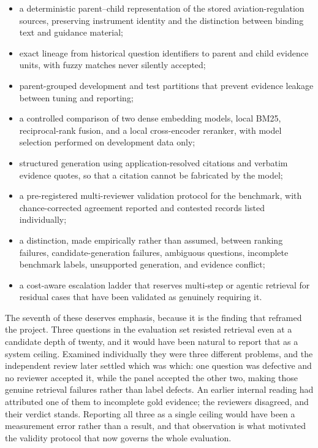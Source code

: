 \begin{itemize}
  \item a deterministic parent--child representation of the stored aviation-regulation sources, preserving instrument identity and the distinction between binding text and guidance material;
  \item exact lineage from historical question identifiers to parent and child evidence units, with fuzzy matches never silently accepted;
  \item parent-grouped development and test partitions that prevent evidence leakage between tuning and reporting;
  \item a controlled comparison of two dense embedding models, local BM25, reciprocal-rank fusion, and a local cross-encoder reranker, with model selection performed on development data only;
  \item structured generation using application-resolved citations and verbatim evidence quotes, so that a citation cannot be fabricated by the model;
  \item a pre-registered multi-reviewer validation protocol for the benchmark, with chance-corrected agreement reported and contested records listed individually;
  \item a distinction, made empirically rather than assumed, between ranking failures, candidate-generation failures, ambiguous questions, incomplete benchmark labels, unsupported generation, and evidence conflict;
  \item a cost-aware escalation ladder that reserves multi-step or agentic retrieval for residual cases that have been validated as genuinely requiring it.
\end{itemize}

The seventh of these deserves emphasis, because it is the finding that reframed the project. Three questions in the evaluation set resisted retrieval even at a candidate depth of twenty, and it would have been natural to report that as a system ceiling. Examined individually they were three different problems, and the independent review later settled which was which: one question was defective and no reviewer accepted it, while the panel accepted the other two, making those genuine retrieval failures rather than label defects. An earlier internal reading had attributed one of them to incomplete gold evidence; the reviewers disagreed, and their verdict stands. Reporting all three as a single ceiling would have been a measurement error rather than a result, and that observation is what motivated the validity protocol that now governs the whole evaluation.

